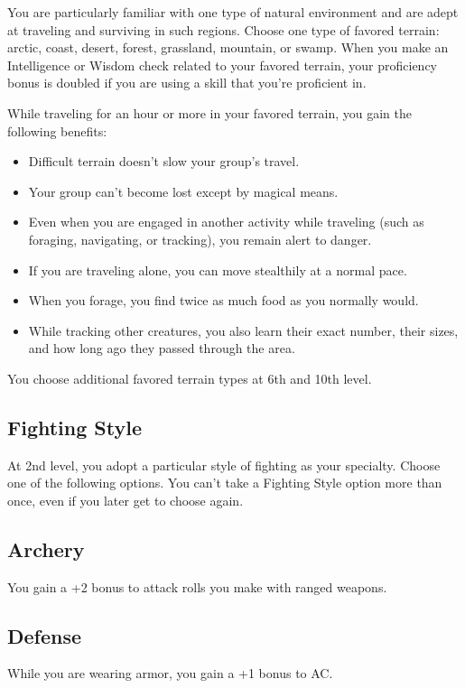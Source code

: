 You are particularly familiar with one type of natural environment and are adept at traveling and surviving in such regions. Choose one type of favored terrain: arctic, coast, desert, forest, grassland, mountain, or swamp. When you make an Intelligence or Wisdom check related to your favored terrain, your proficiency bonus is doubled if you are using a skill that you’re proficient in.

While traveling for an hour or more in your favored terrain, you gain the following benefits:
\begin{itemize}
\item Difficult terrain doesn’t slow your group’s travel.
\item Your group can’t become lost except by magical means.
\item Even when you are engaged in another activity while traveling (such as foraging, navigating, or tracking), you remain alert to danger.
\item If you are traveling alone, you can move stealthily at a normal pace.
\item When you forage, you find twice as much food as you normally would.
\item While tracking other creatures, you also learn their exact number, their sizes, and how long ago they passed through the area.
\end{itemize}

You choose additional favored terrain types at 6th and 10th level.

\subsection{Fighting Style}

At 2nd level, you adopt a particular style of fighting as your specialty. Choose one of the following options. You can’t take a Fighting Style option more than once, even if you later get to choose again.

\subsection{Archery}

You gain a +2 bonus to attack rolls you make with ranged weapons.

\subsection{Defense}

While you are wearing armor, you gain a +1 bonus to AC.

